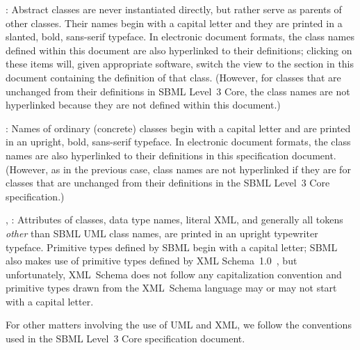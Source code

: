 \begin{description}
  
\item {}: Abstract classes are never
  instantiated directly, but rather serve as parents of other classes.
  Their names begin with a capital letter and they are printed in a
  slanted, bold, sans-serif typeface.  In electronic document formats,
  the class names defined within this document are also hyperlinked to
  their definitions; clicking on these items will, given appropriate
  software, switch the view to the section in this document containing
  the definition of that class.  (However, for classes that are
  unchanged from their definitions in SBML Level~3 Core, the class names
  are not hyperlinked because they are not defined within this
  document.)
  
\item {}: Names of ordinary (concrete) classes begin with a
  capital letter and are printed in an upright, bold, sans-serif
  typeface.  In electronic document formats, the class names are also
  hyperlinked to their definitions in this specification document.
  (However, as in the previous case, class names are not hyperlinked if
  they are for classes that are unchanged from their definitions in the
  SBML Level~3 Core specification.)

\item {}, : Attributes of classes, data
  type names, literal XML, and generally all tokens \emph{other} than
  SBML UML class names, are printed in an upright typewriter typeface.
  Primitive types defined by SBML begin with a capital letter; SBML also
  makes use of primitive types defined by XML
  Schema~1.0~\citep{biron:2000,fallside:2000,thompson:2000}, but
  unfortunately, XML~Schema does not follow any capitalization
  convention and primitive types drawn from the XML~Schema language may
  or may not start with a capital letter.

\end{description}

For other matters involving the use of UML and XML, we follow the
conventions used in the SBML Level~3 Core specification document.  





